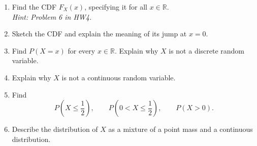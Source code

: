 \documentclass[11pt]{article}
\begin{document}
\begin{enumerate}[label=(\alph*), leftmargin=*]
    \item Find the CDF \(F_X(x)\), specifying it for all \(x\in\mathbb R\).\\
    \textit{Hint: Problem 6 in HW4.}

    \item Sketch the CDF and explain the meaning of its jump at \(x=0\).

    \item Find \(P(X=x)\) for every \(x\in\mathbb R\). Explain why \(X\) is not
    a discrete random variable.

    \item Explain why \(X\) is not a continuous random variable.

    \item Find
    \[
    P\left(X\leq\frac12\right),
    \qquad
    P\left(0<X\leq\frac12\right),
    \qquad
    P(X>0).
    \]

    \item Describe the distribution of \(X\) as a mixture of a point mass and a
    continuous distribution.
\end{enumerate}
 
  
\end{document}
